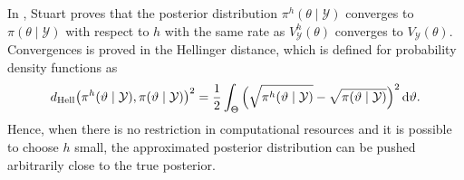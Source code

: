\documentclass[final,onefignum,onetabnum]{siamonline171218}
\begin{document}
 In \cite[Theorem 4.6]{Stu10}, Stuart proves that the posterior distribution $\pi^h(\theta\mid\mathcal{Y})$ converges to $\pi(\theta\mid\mathcal{Y})$ with respect to $h$ with the same rate as $V^h_\mathcal{Y}(\theta)$ converges to $V_\mathcal{Y}(\theta)$. Convergences is proved in the Hellinger distance, which is defined for probability density functions as
\begin{equation}
	d_{\mathrm{Hell}}\big(\pi^h(\vartheta\mid\mathcal{Y}), \pi(\vartheta\mid\mathcal{Y})\big)^2 = \frac{1}{2}\int_{\Theta} \Big(\sqrt{\pi^h(\vartheta\mid\mathcal{Y})} - \sqrt{\pi(\vartheta\mid\mathcal{Y})}\Big)^2 \, \mathrm{d} \vartheta.
\end{equation}
Hence, when there is no restriction in computational resources and it is possible to choose $h$ small, the approximated posterior distribution can be pushed arbitrarily close to the true posterior.
\end{document}
